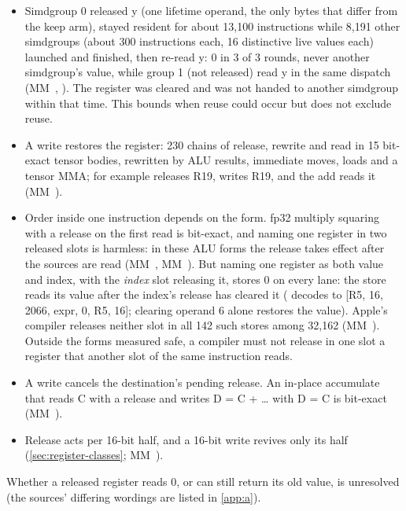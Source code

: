 \begin{itemize}
  The release acts on each lane's copy, gated by the execution mask, and an instruction no lane executes releases
  nothing (\cref{tab:release-mask-arms}). Liveness rule 3 in \cref{sec:loops-loop-variable-rule} follows from this.
\item Simdgroup 0 released y (one
  lifetime operand, the only bytes that differ from the keep arm), stayed resident for about 13,100
  instructions while 8,191 other simdgroups (about 300 instructions each, 16 distinctive live values each) launched and
  finished, then re-read y: 0 in 3 of 3 rounds, never another simdgroup's value, while group 1 (not released) read y in
  the same dispatch (MM~, ). The register was cleared and
  was not handed to another simdgroup within that time. This bounds when reuse could occur but does not exclude reuse.
\item A write restores the register: 230 chains of release, rewrite and read in 15 bit-exact tensor bodies, rewritten by ALU results,
  immediate moves, loads and a tensor MMA; for example  releases R19,  writes R19,
  and the add reads it (MM~).
\item Order inside one instruction depends on the form. fp32 multiply squaring  with a release on the first read
  is bit-exact, and  naming one register in two released slots is harmless: in
  these ALU forms the release takes effect after the sources are read (MM~, MM~). But  naming one register as both value and index, with the \emph{index} slot releasing it, stores 0 on every lane: the
  store reads its value after the index's release has cleared it ( decodes to {[}R5, 16, 2066, expr,
  0, R5, 16{]}; clearing operand 6 alone restores the value). Apple's compiler releases neither slot in all 142 such
  stores among 32,162 (MM~). Outside the forms measured safe, a compiler must not release in one slot a
  register that another slot of the same instruction reads.
\item A write cancels the destination's pending release. An in-place accumulate that reads C with a release and writes
  D = C + \dots{} with D = C is bit-exact (MM~).
\item Release acts per 16-bit half, and a 16-bit write revives only its half (\cref{sec:register-classes}; MM~).
\end{itemize}

Whether a released register reads 0, or can still return its old value, is unresolved (the sources' differing wordings
are listed in \cref{app:a}).

